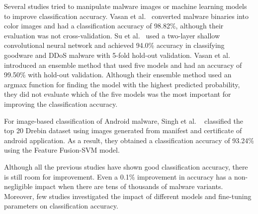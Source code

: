 \documentclass[conference]{IEEEtran}
\begin{document}
Several studies tried to manipulate malware images or machine learning models to improve classification accuracy.
Vasan et al.~\cite{VASAN2020107138} converted malware binaries into color images and had a classification accuracy of 98.82\%, although their evaluation was not cross-validation.
Su et al.~\cite{8377943} used a two-layer shallow convolutional neural network and achieved 94.0\% accuracy in classifying goodware and DDoS malware with 5-fold hold-out validation.
Vasan et al.~\cite{VASAN2020101748} introduced an ensemble method that used five models and had an accuracy of 99.50\% with hold-out validation.
Although their ensemble method used an argmax function for finding the model with the highest predicted probability, they did not evaluate which of the five models was the most important for improving the classification accuracy. 

For image-based classification of Android malware, Singh et al. ~\cite{9461194} classified the top 20 Drebin dataset using images generated from manifest and certificate of android application. 
As a result, they obtained a classification accuracy of 93.24\% using the Feature Fusion-SVM model.

Although all the previous studies have shown good classification accuracy, there is still room for improvement.
Even a 0.1\% improvement in accuracy has a non-negligible impact when there are tens of thousands of malware variants.
Moreover, few studies investigated the impact of different models and fine-tuning parameters on classification accuracy.
\end{document}
